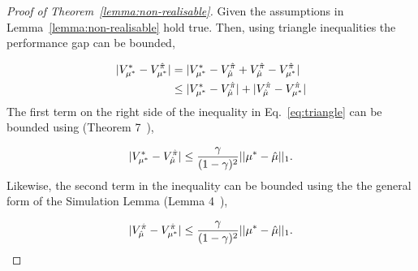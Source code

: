 \begin{proof}[Proof of Theorem~\ref{lemma:non-realisable}]
Given the assumptions in Lemma~\ref{lemma:non-realisable} hold true. Then, using triangle inequalities the performance gap can be bounded,

\begin{equation}
\begin{aligned}\label{eq:triangle}
    |V_{{\mu^*}}^{*}-V_{{\mu^*}}^{\hat{\pi}}| &= |V_{{\mu^*}}^{*}-V_{\hat{\mu}}^{\hat{\pi}}+V_{\hat{\mu}}^{\hat{\pi}}-V_{{\mu^*}}^{\hat{\pi}}|\\
    &\leq |V_{{\mu^*}}^{*}-V_{\hat{\mu}}^{\hat{\pi}}|+|V_{\hat{\mu}}^{\hat{\pi}}-V_{{\mu^*}}^{\hat{\pi}}|
\end{aligned}
\end{equation}
The first term on the right side of the inequality in Eq.~\ref{eq:triangle} can be bounded using (Theorem 7~\citet{zhang2020multi}),

\begin{equation}
    |V^{*}_{\mu^{*}}-V_{\hat{\mu}}^{\hat{\pi}}| \leq \frac{\gamma}{(1-\gamma)^2}||\mu^{*}-\hat{\mu}||_1.
\end{equation}
Likewise, the second term in the inequality can be bounded using the the general form of the Simulation Lemma (Lemma 4~\citet{kearns2002near}),

\begin{equation}
    |V_{\hat{\mu}}^{\hat{\pi}}-{V}_{{\mu^*}}^{\hat{\pi}}| \leq \frac{\gamma}{(1-\gamma)^2}||\mu^{*}-\hat{\mu}||_1.
\end{equation}


\end{proof}
